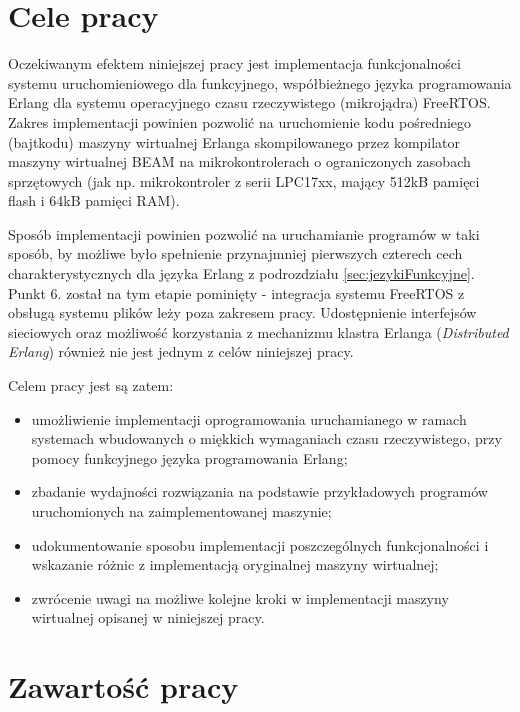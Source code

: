 \section{Cele pracy}
\label{sec:celePracy}

Oczekiwanym efektem niniejszej pracy jest implementacja funkcjonalności systemu uruchomieniowego dla funkcyjnego, współbieżnego języka programowania Erlang dla systemu operacyjnego czasu rzeczywistego (mikrojądra) FreeRTOS.
Zakres implementacji powinien pozwolić na uruchomienie kodu pośredniego (bajtkodu) maszyny wirtualnej Erlanga skompilowanego przez kompilator maszyny wirtualnej BEAM na mikrokontrolerach o ograniczonych zasobach sprzętowych (jak np. mikrokontroler z serii LPC17xx, mający 512kB pamięci flash i 64kB pamięci RAM).

Sposób implementacji powinien pozwolić na uruchamianie programów w taki sposób, by możliwe było spełnienie przynajmniej pierwszych czterech cech charakterystycznych dla języka Erlang z podrozdziału \ref{sec:jezykiFunkcyjne}. Punkt 6. został na tym etapie pominięty - integracja systemu FreeRTOS z obsługą systemu plików leży poza zakresem pracy. Udostępnienie interfejsów sieciowych oraz możliwość korzystania z mechanizmu klastra Erlanga (\emph{Distributed Erlang}) również nie jest jednym z celów niniejszej pracy.

Celem pracy jest są zatem:
\begin{itemize}
\item umożliwienie implementacji oprogramowania uruchamianego w ramach systemach wbudowanych o miękkich wymaganiach czasu rzeczywistego, przy pomocy funkcyjnego języka programowania Erlang;
\item zbadanie wydajności rozwiązania na podstawie przykładowych programów uruchomionych na zaimplementowanej maszynie;
\item udokumentowanie sposobu implementacji poszczególnych funkcjonalności i wskazanie różnic z implementacją oryginalnej maszyny wirtualnej;
\item zwrócenie uwagi na możliwe kolejne kroki w implementacji maszyny wirtualnej opisanej w niniejszej pracy.
\end{itemize}


\section{Zawartość pracy}
\label{sec:zawartoscPracy}